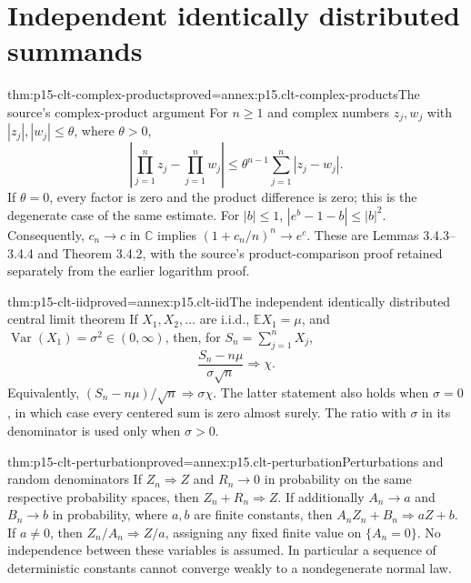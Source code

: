 \section{Independent identically distributed summands}
\label{sec:p15-clt-iid}

\begin{hblemma}{thm:p15-clt-complex-products}{proved=annex:p15.clt-complex-products}{The source's complex-product argument}
For \(n\geq1\) and complex numbers \(z_j,w_j\) with
\(|z_j|,|w_j|\leq\theta\), where \(\theta>0\),
\[
 \left|\prod_{j=1}^nz_j-\prod_{j=1}^nw_j\right|
 \leq\theta^{n-1}\sum_{j=1}^n|z_j-w_j|.
\]
If \(\theta=0\), every factor is zero and the product difference
is zero; this is the degenerate case of the same estimate.
For \(|b|\leq1\), \(|e^b-1-b|\leq|b|^2\).
Consequently, \(c_n\to c\) in \(\mathbb C\) implies
\((1+c_n/n)^n\to e^c\).
These are Lemmas 3.4.3--3.4.4 and Theorem 3.4.2, with the
source's product-comparison proof retained separately from the earlier
logarithm proof.
\end{hblemma}

\begin{hbtheorem}{thm:p15-clt-iid}{proved=annex:p15.clt-iid}{The independent identically distributed central limit theorem}
If \(X_1,X_2,\ldots\) are i.i.d.,
\(\mathbb EX_1=\mu\), and
\(\operatorname{Var}(X_1)=\sigma^2\in(0,\infty)\), then, for
\(S_n=\sum_{j=1}^nX_j\),
\[
 \frac{S_n-n\mu}{\sigma\sqrt n}\Rightarrow\chi.
\]
Equivalently, \((S_n-n\mu)/\sqrt n\Rightarrow\sigma\chi\).
The latter statement also holds when \(\sigma=0\), in which case
every centered sum is zero almost surely. The ratio with \(\sigma\)
in its denominator is used only when \(\sigma>0\).
\end{hbtheorem}

\begin{hblemma}{thm:p15-clt-perturbation}{proved=annex:p15.clt-perturbation}{Perturbations and random denominators}
If \(Z_n\Rightarrow Z\) and \(R_n\to0\) in probability on the
same respective probability spaces, then \(Z_n+R_n\Rightarrow Z\).
If additionally \(A_n\to a\) and \(B_n\to b\) in probability,
where \(a,b\) are finite constants, then
\(A_nZ_n+B_n\Rightarrow aZ+b\).
If \(a\ne0\), then \(Z_n/A_n\Rightarrow Z/a\), assigning any
fixed finite value on \(\{A_n=0\}\).
No independence between these variables is assumed.
In particular a sequence of deterministic constants cannot converge
weakly to a nondegenerate normal law.
\end{hblemma}

